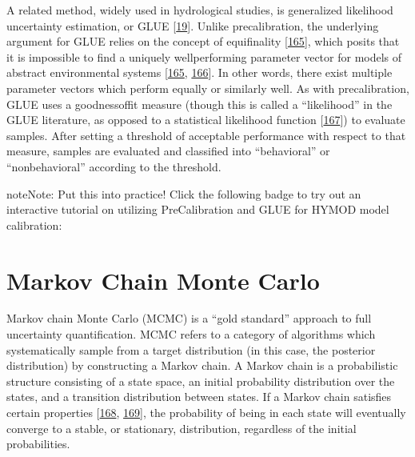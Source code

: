 \documentclass[letterpaper,10pt,english]{book}
\begin{document}
\sphinxAtStartPar
A related method, widely used in hydrological studies, is generalized likelihood uncertainty estimation, or GLUE {[}\hyperlink{cite.index:id38}{19}{]}. Unlike pre\sphinxhyphen{}calibration, the underlying argument for GLUE relies on the concept of equifinality {[}\hyperlink{cite.index:id43}{165}{]}, which posits that it is impossible to find a uniquely well\sphinxhyphen{}performing parameter vector for models of abstract environmental systems {[}\hyperlink{cite.index:id43}{165}, \hyperlink{cite.index:id44}{166}{]}. In other words, there exist multiple parameter vectors which perform equally or similarly well. As with pre\sphinxhyphen{}calibration, GLUE uses a goodness\sphinxhyphen{}of\sphinxhyphen{}fit measure (though this is called a “likelihood” in the GLUE literature, as opposed to a statistical likelihood function {[}\hyperlink{cite.index:id45}{167}{]}) to evaluate samples. After setting a threshold of acceptable performance with respect to that measure, samples are evaluated and classified into “behavioral” or “non\sphinxhyphen{}behavioral” according to the threshold.

\begin{sphinxadmonition}{note}{Note:}
\sphinxAtStartPar
Put this into practice! Click the following badge to try out an interactive tutorial on utilizing Pre\sphinxhyphen{}Calibration and GLUE for HYMOD model calibration:  
\end{sphinxadmonition}


\section{Markov Chain Monte Carlo}
\label{\detokenize{A1_Uncertainty_Quantification:markov-chain-monte-carlo}}
\sphinxAtStartPar
Markov chain Monte Carlo (MCMC) is a “gold standard” approach to full uncertainty quantification. MCMC refers to a category of algorithms which systematically sample from a target distribution (in this case, the posterior distribution) by constructing a Markov chain. A Markov chain is a probabilistic structure consisting of a state space, an initial probability distribution over the states, and a transition distribution between states. If a Markov chain satisfies certain properties {[}\hyperlink{cite.index:id170}{168}, \hyperlink{cite.index:id169}{169}{]}, the probability of being in each state will eventually converge to a stable, or stationary, distribution, regardless of the initial probabilities.
\end{document}
